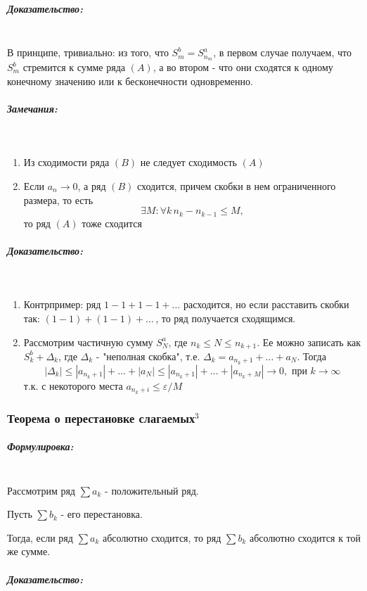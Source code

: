 \documentclass{article}
\let\vanillasubparagraph\subparagraph
\renewcommand{\subparagraph}[1]{\vanillasubparagraph{#1}\mbox{}\\}
\begin{document}
\subparagraph{Доказательство:}
В принципе, тривиально: из того, что $S_m^b = S_{n_m}^a$, в первом случае получаем, что $S_m^b$ стремится к сумме ряда $(A)$, а во втором - что они сходятся к одному конечному значению или к бесконечности одновременно. 

\subparagraph{Замечания:}
\begin{enumerate}
    \item Из сходимости ряда $(B)$ не следует сходимость $(A)$
    \item Если $a_n \to 0$, а ряд $(B)$ сходится, причем скобки в нем ограниченного размера, то есть 
        $$
        \exists M: \forall k \, n_k - n_{k-1} \leq M,
        $$
        то ряд $(A)$ тоже сходится
\end{enumerate}

\subparagraph{Доказательство:}
\begin{enumerate}
    \item Контрпример: ряд $1 - 1 + 1 - 1 + \ldots$ расходится, но если расставить скобки так: $(1-1) + (1-1) + \ldots\,$, то ряд получается сходящимся.
    \item Рассмотрим частичную сумму $S_N^a$, где $n_k \leq N \leq n_{k+1}$. Ее можно записать как $S_k^b + \Delta_k$, где $\Delta_k$ - "неполная скобка", т.е. $\Delta_k = a_{n_k + 1} + \ldots + a_N$. Тогда 
        $$
    |\Delta_k| \leq |a_{n_k + 1}| + \ldots + |a_N| \leq |a_{n_k + 1}| + \ldots + |a_{n_k + M}| \to 0, \text{ при } k \to \infty
        $$
        т.к. с некоторого места $a_{n_k + i} \leq \varepsilon/M$
\end{enumerate}

\subsubsection{Теорема о перестановке слагаемых\texorpdfstring{$^3$}{}}

\subparagraph{Формулировка:}

Рассмотрим ряд $\sum a_k$ - положительный ряд. 

Пусть $\sum b_k$ - его перестановка. 

Тогда,
если ряд $\sum a_k$ абсолютно сходится, то ряд $\sum b_k$ абсолютно сходится к той же сумме.

\subparagraph{Доказательство: }
\end{document}
